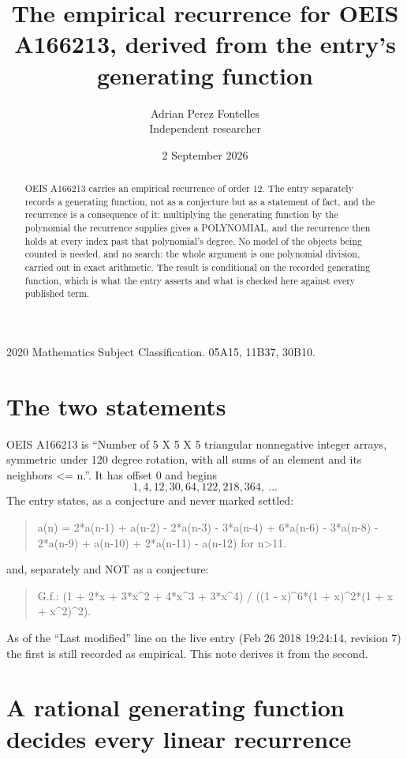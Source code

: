 \documentclass[11pt,a4paper]{article}
\title{The empirical recurrence for OEIS A166213, derived from the entry's generating function}
\author{Adrian Perez Fontelles\\ \small Independent researcher}
\date{2 September 2026}
\theoremstyle{plain}
\theoremstyle{definition}
\begin{document}
\maketitle

\begin{abstract}
OEIS A166213 carries an empirical recurrence of order $12$. The entry separately records a
generating function, not as a conjecture but as a statement of fact, and the recurrence is a
consequence of it: multiplying the generating function by the polynomial the recurrence
supplies gives a POLYNOMIAL, and the recurrence then holds at every index past that
polynomial's degree. No model of the objects being counted is needed, and no search: the
whole argument is one polynomial division, carried out in exact arithmetic. The result is
conditional on the recorded generating function, which is what the entry asserts and what is
checked here against every published term.
\end{abstract}

\noindent\small 2020 Mathematics Subject Classification. 05A15, 11B37, 30B10.\normalsize

\section{The two statements}

OEIS A166213 is ``Number of 5 X 5 X 5 triangular nonnegative integer arrays, symmetric under 120 degree rotation, with all sums of an element and its neighbors <= n.''. It has offset $0$ and begins
\[
1, 4, 12, 30, 64, 122, 218, 364,\ \dots
\]
The entry states, as a conjecture and never marked settled:
\begin{quote}
a(n) = 2*a(n-1) + a(n-2) - 2*a(n-3) - 3*a(n-4) + 6*a(n-6) - 3*a(n-8) - 2*a(n-9) + a(n-10) + 2*a(n-11) - a(n-12) for n>11.
\end{quote}
and, separately and NOT as a conjecture:
\begin{quote}
G.f.: (1 + 2*x + 3*x\^{}2 + 4*x\^{}3 + 3*x\^{}4) / ((1 - x)\^{}6*(1 + x)\^{}2*(1 + x + x\^{}2)\^{}2).
\end{quote}
As of the ``Last modified'' line on the live entry (Feb 26 2018 19:24:14, revision 7) the first is still
recorded as empirical. This note derives it from the second.

\section{A rational generating function decides every linear recurrence}
\end{document}
